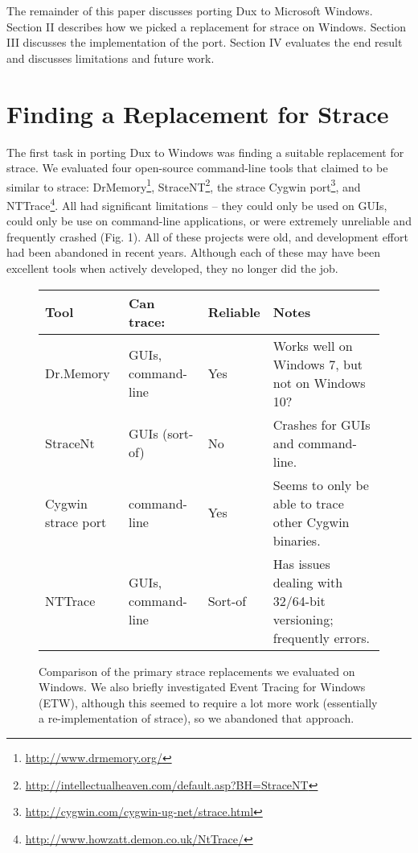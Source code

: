 \documentclass[10pt,conference]{IEEEtran}
\begin{document}
The remainder of this paper discusses porting Dux to Microsoft Windows. Section II
describes how we picked a replacement for strace on Windows. Section 
III discusses the implementation of the port. Section IV evaluates the end result
and discusses limitations and future work.

\section{Finding a Replacement for Strace} 

The first task in porting Dux to Windows was finding a suitable replacement
for strace. We evaluated four open-source command-line tools that claimed to be
similar to strace: DrMemory\footnote{\url{http://www.drmemory.org/}},
StraceNT\footnote{\url{http://intellectualheaven.com/default.asp?BH=StraceNT}},
the strace Cygwin port\footnote{\url{http://cygwin.com/cygwin-ug-net/strace.html}},
and NTTrace\footnote{\url{http://www.howzatt.demon.co.uk/NtTrace/}}. 
All had significant limitations -- they could only be used on GUIs, could only
be use on command-line applications, or were extremely unreliable and frequently
crashed (Fig. 1). All of these projects were old, and development effort had been
abandoned in recent years. Although each of these may have been excellent tools
when actively developed, they no longer did the job.

\begin{figure}
\begin{center}
\begin{tabular}{ |p{1.6cm}|p{1.5cm}|p{1 cm}|p{3 cm}|}
 \hline
 Tool & Can trace: & Reliable & Notes \\ \hline \hline
 Dr.Memory & GUIs, command-line & Yes & Works well on Windows 7, but not on Windows 10? \\ \hline
 StraceNt & GUIs (sort-of) & No & Crashes for GUIs and command-line. \\ \hline
Cygwin strace port & command-line & Yes & Seems to only be able to trace other Cygwin binaries. \\ \hline
NTTrace & GUIs, command-line & Sort-of & Has issues dealing with 32/64-bit versioning; frequently errors. \\
 \hline
\end{tabular}
\end{center}
\caption{Comparison of the primary strace replacements we evaluated on Windows.
We also briefly investigated Event Tracing for Windows (ETW), although this seemed
to require a lot more work (essentially a re-implementation of strace), so we
abandoned that approach.}
\end{figure}
\end{document}
